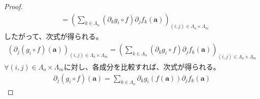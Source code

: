 \documentclass[dvipdfmx]{jsarticle}
\begin{document}
\begin{proof}
\begin{align*}
&= \left( \sum_{k \in \varLambda_{n}} {\left( \partial_{k}g_{i} \circ f \right)\partial_{j}f_{k}}\left( \mathbf{a} \right) \right)_{(i,j) \in \varLambda_{o} \times \varLambda_{m}}
\end{align*}
したがって、次式が得られる。
\begin{align*}
\left( \partial_{j}\left( g_{i} \circ f \right)\left( \mathbf{a} \right) \right)_{(i,j) \in \varLambda_{o} \times \varLambda_{m}} = \left( \sum_{k \in \varLambda_{n}} {\left( \partial_{k}g_{i} \circ f \right)\partial_{j}f_{k}}\left( \mathbf{a} \right) \right)_{(i,j) \in \varLambda_{o} \times \varLambda_{m}}
\end{align*}
$\forall(i,j) \in \varLambda_{o} \times \varLambda_{m}$に対し、各成分を比較すれば、次式が得られる。
\begin{align*}
\partial_{j}\left( g_{i} \circ f \right)\left( \mathbf{a} \right) = \sum_{k \in \varLambda_{n}} {\partial_{k}g_{i}\left( f\left( \mathbf{a} \right) \right)\partial_{j}f_{k}\left( \mathbf{a} \right)}
\end{align*}
\end{proof}
\end{document}
